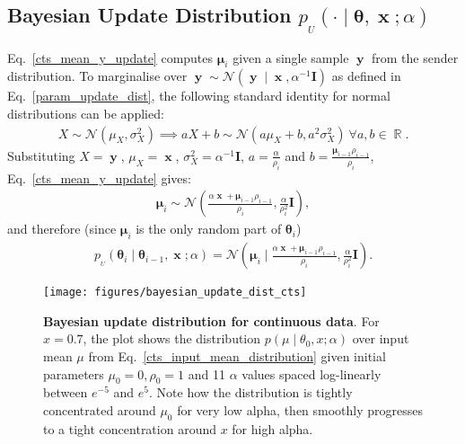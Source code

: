 \documentclass[11pt,table]{article}
\DeclareMathOperator{\x}{\mathbf{x}}
\DeclareMathOperator{\y}{\mathbf{y}}
\newcommand{\pt}[1]{\rho_{#1}}
\newcommand{\mt}[1]{\boldsymbol{\mu}_{#1}}
\newcommand{\N}[2]{\mathcal{N}\left(#1 , #2\right)}
\DeclareMathOperator{\R}{\mathbb{R}}
\newcommand{\I}[1]{\boldsymbol{I}}
\newcommand{\tidx}[2]{#1_{#2}}
\renewcommand{\vec}[1]{\boldsymbol{#1}}
\newcommand{\pars}{\theta}
\newcommand{\parsn}{\vec{\pars}}
\newcommand{\parsnt}[1]{\tidx{\parsn}{#1}}
\newcommand{\0}[1]{\constvec{0}{#1}}
\newcommand{\1}[1]{\constvec{1}{#1}}
\newcommand{\update}{p_{_U}}
\begin{document}
\subsection{Bayesian Update Distribution \texorpdfstring{$\update(\cdot \mid \parsn, \x; \alpha)$}{}}
Eq.~\ref{cts_mean_y_update} computes $\mt{i}$ given a single sample $\y$ from the sender distribution.
To marginalise over $\y \sim \N{\y \mid \x}{\alpha^{-1}\I{D}}$ as defined in Eq.~\ref{param_update_dist}, the following standard identity for normal distributions can be applied:
\begin{align}
X \sim \N{\mu_X}{\sigma_X^2} \implies aX + b \sim \N{a\mu_X + b}{a^2\sigma_X^2}\  \forall a, b \in \R.\label{normal_identity_1}
\end{align}
Substituting $X=\y$, $\mu_X=\x$, $\sigma^2_X=\alpha^{-1}\I{D}$, $a=\frac{\alpha}{\pt{i}}$ and $b=\frac{\mt{i-1}\pt{i-1}}{\pt{i}}$, Eq.~\ref{cts_mean_y_update} gives:
\begin{align}
\mt{i} \sim \N{\frac{\alpha \x + \mt{i-1}\pt{i-1}}{\pt{i}}}{\frac{\alpha}{\pt{i
}^2}\I{D}},\label{cts_input_mean_distribution}
\end{align}
and therefore (since $\mt{i}$ is the only random part of $\parsnt{i}$)
\begin{align}
\update(\parsnt{i} \mid \parsnt{i-1}, \x; \alpha) = \N{\mt{i} \mid \frac{\alpha \x + \mt{i-1}\pt{i-1}}{\pt{i}}}{\frac{\alpha}{\pt{i
}^2}\I{D}}.\label{cts_update_dist}
\end{align}
\begin{figure}[t]
\texttt{[image: figures/bayesian\_update\_dist\_cts]}
\caption{\textbf{Bayesian update distribution for continuous data}. For $x=0.7$, the plot shows the distribution $p(\mu \mid \theta_0, x; \alpha)$ over input mean $\mu$ from Eq.~\ref{cts_input_mean_distribution} given initial parameters $\mu_0=0, \rho_0=1$ and 11 $\alpha$ values spaced log-linearly between $e^{-5}$ and $e^5$. Note how the distribution is tightly concentrated around $\mu_0$ for very low alpha, then smoothly progresses to a tight concentration around $x$ for high alpha.}
\end{figure}
\end{document}
